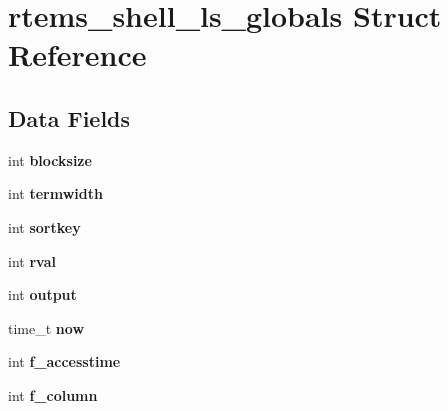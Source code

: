 \hypertarget{structrtems__shell__ls__globals}{}\section{rtems\+\_\+shell\+\_\+ls\+\_\+globals Struct Reference}
\label{structrtems__shell__ls__globals}
\subsection*{Data Fields}
\begin{DoxyCompactItemize}
\item 
\mbox{\label{structrtems__shell__ls__globals_aba0472f3bf7eaa786a1b3121695fec48}} 
int {\bfseries blocksize}
\item 
\mbox{\label{structrtems__shell__ls__globals_a0e651d5099412fbbf0b54826018dcfda}} 
int {\bfseries termwidth}
\item 
\mbox{\label{structrtems__shell__ls__globals_a9bfee576440571c71e44c3a2cedd980a}} 
int {\bfseries sortkey}
\item 
\mbox{\label{structrtems__shell__ls__globals_abefd3beee684857c264e1ac27c6637cb}} 
int {\bfseries rval}
\item 
\mbox{\label{structrtems__shell__ls__globals_a0725303132ef9ed36d2399fb80590ffc}} 
int {\bfseries output}
\item 
\mbox{\label{structrtems__shell__ls__globals_a8c4c74a01e72461dd377cabf85fdd761}} 
time\+\_\+t {\bfseries now}
\item 
\mbox{\label{structrtems__shell__ls__globals_afab8f6459adba961dde165f00fe8c5a3}} 
int {\bfseries f\+\_\+accesstime}
\item 
\mbox{\label{structrtems__shell__ls__globals_abc25e2d827111d434fbc34680af1d9a9}} 
int {\bfseries f\+\_\+column}
\item 
\mbox{\label{structrtems__shell__ls__globals_a9e228853b9a5c2aaad531e0279954bdf}} 

\end{DoxyCompactItemize}
